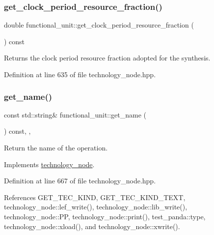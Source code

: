 \subsubsection{\texorpdfstring{get\+\_\+clock\+\_\+period\+\_\+resource\+\_\+fraction()}{get\_clock\_period\_resource\_fraction()}}
{\footnotesize\ttfamily double functional\+\_\+unit\+::get\+\_\+clock\+\_\+period\+\_\+resource\+\_\+fraction (\begin{DoxyParamCaption}{ }\end{DoxyParamCaption}) const\hspace{0.3cm}{\ttfamily [inline]}}



Returns the clock period resource fraction adopted for the synthesis. 



Definition at line 635 of file technology\+\_\+node.\+hpp.

\mbox{\label{structfunctional__unit_a9761616dcfc8f37c93431d4260127ceb}} 
\subsubsection{\texorpdfstring{get\+\_\+name()}{get\_name()}}
{\footnotesize\ttfamily const std\+::string\& functional\+\_\+unit\+::get\+\_\+name (\begin{DoxyParamCaption}{ }\end{DoxyParamCaption}) const\hspace{0.3cm}{\ttfamily [inline]}, {\ttfamily [override]}, {\ttfamily [virtual]}}



Return the name of the operation. 



Implements \hyperlink{structtechnology__node_ade1d568637cfe8de91fc732fba4d62d5}{technology\+\_\+node}.



Definition at line 667 of file technology\+\_\+node.\+hpp.



References G\+E\+T\+\_\+\+T\+E\+C\+\_\+\+K\+I\+ND, G\+E\+T\+\_\+\+T\+E\+C\+\_\+\+K\+I\+N\+D\+\_\+\+T\+E\+XT, technology\+\_\+node\+::lef\+\_\+write(), technology\+\_\+node\+::lib\+\_\+write(), technology\+\_\+node\+::\+PP, technology\+\_\+node\+::print(), test\+\_\+panda\+::type, technology\+\_\+node\+::xload(), and technology\+\_\+node\+::xwrite().



